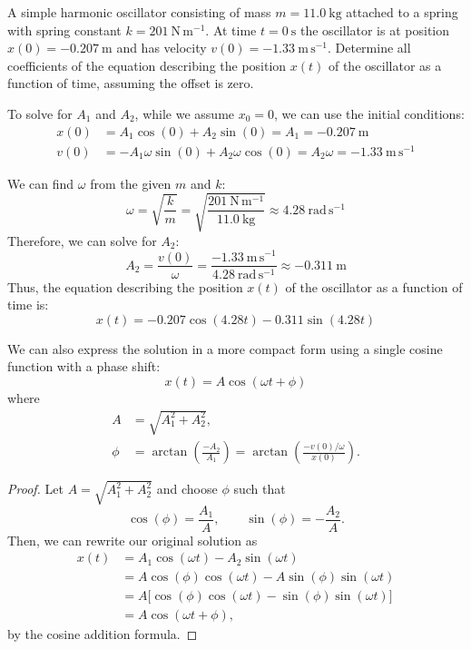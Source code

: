 \documentclass[11pt]{report}
\begin{document}
\begin{example}
    A simple harmonic oscillator consisting of mass \(m = 11.0\ \mathrm{kg}\) attached to a spring with spring constant \(k = 201\ \mathrm{N\,m^{-1}}\). At time \(t=0\ \mathrm{s}\) the oscillator is at position \(x(0) = -0.207\ \mathrm{m}\) and has velocity \(v(0) = -1.33\ \mathrm{m\,s^{-1}}\). Determine all coefficients of the equation describing the position \(x(t)\) of the oscillator as a function of time, assuming the offset is zero. 

    To solve for $A_1$ and $A_2$, while we assume $x_0 = 0$, we can use the initial conditions:
    \begin{align*}
        x(0) &= A_1 \cos(0) + A_2 \sin(0) = A_1 = -0.207\ \mathrm{m} \\
        v(0) &= -A_1 \omega \sin(0) + A_2 \omega \cos(0) = A_2 \omega = -1.33\ \mathrm{m\,s^{-1}}
    \end{align*}

    We can find $\omega$ from the given $m$ and $k$:
    $$
    \omega = \sqrt{\frac{k}{m}} = \sqrt{\frac{201\ \mathrm{N\,m^{-1}}}{11.0\ \mathrm{kg}}} \approx 4.28\ \mathrm{rad\,s^{-1}}
    $$
    Therefore, we can solve for $A_2$:
    $$
    A_2 = \frac{v(0)}{\omega} = \frac{-1.33\ \mathrm{m\,s^{-1}}}{4.28\ \mathrm{rad\,s^{-1}}} \approx -0.311\ \mathrm{m}
    $$
    Thus, the equation describing the position \(x(t)\) of the oscillator as a function of time is:
    $$
    x(t) = -0.207 \cos(4.28 t) - 0.311 \sin(4.28 t)
    $$
\end{example}
\begin{theorem}
We can also express the solution in a more compact form using a single cosine function with a phase shift:
\begin{equation}
    x(t) = A \cos(\omega t + \phi)
\end{equation}
where
\begin{subequations}
    \begin{align}
        A &= \sqrt{A_1^2 + A_2^2}, \\
        \phi &= \arctan\!\left(\frac{-A_2}{A_1}\right) 
              = \arctan\!\left(\frac{-v(0)/\omega}{x(0)}\right).
    \end{align}
\end{subequations}
\end{theorem}

\begin{proof}
Let $A = \sqrt{A_1^2 + A_2^2}$ and choose $\phi$ such that 
\[
\cos(\phi) = \frac{A_1}{A}, \qquad \sin(\phi) = -\frac{A_2}{A}.
\]
Then, we can rewrite our original solution as
\begin{align*}
    x(t) &= A_1 \cos(\omega t) - A_2 \sin(\omega t) \\
         &= A \cos(\phi) \cos(\omega t) - A \sin(\phi) \sin(\omega t) \\
         &= A \big[\cos(\phi)\cos(\omega t) - \sin(\phi)\sin(\omega t)\big] \\ 
         &= A \cos(\omega t + \phi),
\end{align*}
by the cosine addition formula.
\end{proof}
\end{document}
